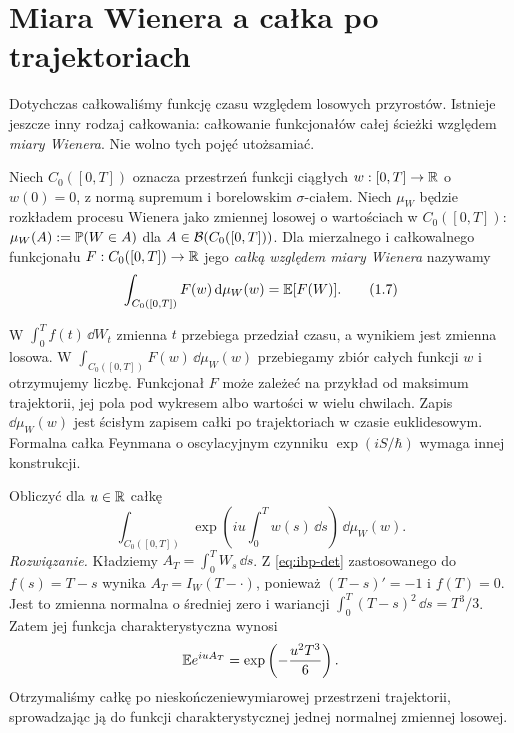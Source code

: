 \section{Miara Wienera a całka po trajektoriach}
Dotychczas całkowaliśmy funkcję czasu względem losowych
przyrostów. Istnieje jeszcze inny rodzaj całkowania:
całkowanie funkcjonałów całej ścieżki względem \emph{miary
Wienera}. Nie wolno tych pojęć utożsamiać.

\begin{definicja}
Niech $C_0([0,T])$ oznacza przestrzeń funkcji ciągłych
$w:[0,T]\to\mathbb{R}$ o $w(0)=0$, z normą supremum i borelowskim
$\sigma$-ciałem. Niech $\mu_W$ będzie rozkładem procesu Wienera
jako zmiennej losowej o wartościach w $C_0([0,T])$:
$\mu_W(A):=\mathbb{P}(W\in A)$ dla $A\in\mathcal{B}(C_0([0,T]))$.
Dla mierzalnego i całkowalnego funkcjonału
$F:C_0([0,T])\to\mathbb{R}$ jego \emph{całką względem miary Wienera}
nazywamy
\[
\int_{C_0([0,T])}F(w)\,\mathrm{d}\mu_W(w)=\mathbb{E}[F(W)].
\tag{1.7}
\]
\end{definicja}

\begin{uwaga}
W $\int_0^Tf(t)\,\dd W_t$ zmienna $t$ przebiega przedział
czasu, a wynikiem jest zmienna losowa. W
$\int_{C_0([0,T])}F(w)\,\dd\mu_W(w)$ przebiegamy zbiór
całych funkcji $w$ i otrzymujemy liczbę. Funkcjonał $F$
może zależeć na przykład od maksimum trajektorii,
jej pola pod wykresem albo wartości w wielu chwilach.
Zapis $\dd\mu_W(w)$ jest ścisłym zapisem całki po trajektoriach
w czasie euklidesowym. Formalna całka Feynmana o oscylacyjnym
czynniku $\exp(iS/\hbar)$ wymaga innej konstrukcji.
\end{uwaga}

\begin{zadanie}\label{zad:area-char}
Obliczyć dla $u\in\mathbb{R}$ całkę
\[
\int_{C_0([0,T])}
\exp\left(iu\int_0^T w(s)\,\dd s\right)\,\dd\mu_W(w).
\]
\emph{Rozwiązanie.}
Kładziemy $A_T=\int_0^TW_s\,\dd s$.
Z \eqref{eq:ibp-det} zastosowanego do $f(s)=T-s$
wynika $A_T=I_W(T-\cdot)$, ponieważ $(T-s)'=-1$
i $f(T)=0$. Jest to zmienna normalna o średniej zero
i wariancji
$\int_0^T(T-s)^2\,\dd s=T^3/3$.
Zatem jej funkcja charakterystyczna wynosi
\[
\mathbb{E} e^{iuA_T}=\exp\left(-\frac{u^2T^3}{6}\right).
\]
Otrzymaliśmy całkę po nieskończeniewymiarowej przestrzeni
trajektorii, sprowadzając ją do funkcji charakterystycznej
jednej normalnej zmiennej losowej.
\end{zadanie}

